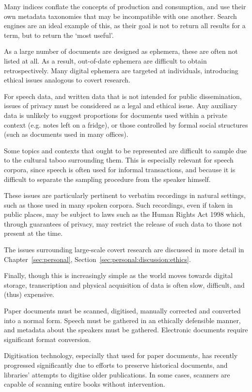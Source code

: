 Many indices conflate the concepts of production and consumption, and use their own metadata taxonomies that may be incompatible with one another.  Search engines are an ideal example of this, as their goal is not to return all results for a term, but to return the `most useful'.

As a large number of documents are designed as ephemera, these are often not listed at all.  As a result, out-of-date ephemera are difficult to obtain retrospectively.  Many digital ephemera are targeted at individuals, introducing ethical issues analogous to covert research.

For speech data, and written data that is not intended for public dissemination, issues of privacy must be considered as a legal and ethical issue.  Any auxiliary data is unlikely to suggest proportions for documents used within a private context (e.g. notes left on a fridge), or those controlled by formal social structures (such as documents used in many offices).

Some topics and contexts that ought to be represented are difficult to sample due to the cultural taboo surrounding them. This is especially relevant for speech corpora, since speech is often used for informal transactions, and because it is difficult to separate the sampling procedure from the speaker himself.

These issues are particularly pertinent to verbatim recordings in natural settings, such as those used in many spoken corpora.  Such recordings, even if taken in public places, may be subject to laws such as the Human Rights Act 1998 which, through guarantees of privacy, may restrict the release of such data to those not present at the time.

The issues surrounding large-scale covert research are discussed in more detail in Chapter~\ref{sec:personal}, Section~\ref{sec:personal:discussion:ethics}.

Finally, though this is increasingly simple as the world moves towards digital storage, transcription and physical acquisition of data is often slow, difficult, and (thus) expensive.

Paper documents must be scanned, digitised, manually corrected and converted into a normal form. Speech must be gathered in an ethically defensible manner, and metadata about the speakers must be gathered.  Electronic documents require significant format conversion.

Digitisation technology, especially that used for paper documents, has recently progressed significantly due to efforts to preserve historical documents, and libraries' attempts to digitise older publications. In some cases, scanners are capable of scanning entire books without intervention.








